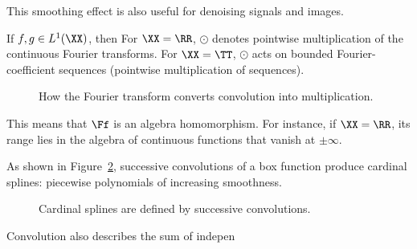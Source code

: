 This smoothing effect is also useful for denoising signals and images.



   
\begin{prop}
If $f,g\in L^1(\XX)$, then
For $\XX=\RR$, $\odot$ denotes pointwise multiplication of the continuous Fourier transforms.
For $\XX=\TT$, $\odot$ acts on bounded Fourier-coefficient sequences (pointwise multiplication of sequences).
\end{prop}


           
\begin{figure}[tbp]
\centering
{}
\caption{How the Fourier transform converts convolution into multiplication.}
\label{fig-review-fourier-convolution-fourier}
\end{figure}
This means that $\Ff$ is an algebra homomorphism. For instance, if $\XX=\RR$, its range lies in the algebra of continuous functions that vanish at $\pm\infty$.

As shown in Figure~\ref{fig-splines}, successive convolutions of a box function produce cardinal splines: piecewise polynomials of increasing smoothness.

\begin{figure}[tbp]
\centering
{}
\caption{Cardinal splines are defined by successive convolutions.}
\label{fig-splines}
\end{figure}


Convolution also describes the sum of indepen